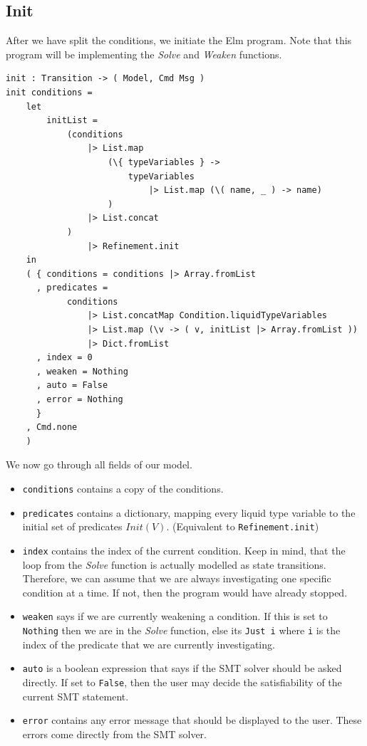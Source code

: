 \documentclass[]{scrbook}
\providecommand{\tightlist}{%
  \setlength{\itemsep}{0pt}\setlength{\parskip}{0pt}}
\theoremstyle{definition}
\theoremstyle{definition}
\theoremstyle{definition}
\theoremstyle{remark}
\begin{document}
\subsection{Init}\label{init}

After we have split the conditions, we initiate the Elm program. Note
that this program will be implementing the \emph{Solve} and
\emph{Weaken} functions.

\begin{verbatim}
init : Transition -> ( Model, Cmd Msg )
init conditions =
    let
        initList =
            (conditions
                |> List.map
                    (\{ typeVariables } ->
                        typeVariables
                            |> List.map (\( name, _ ) -> name)
                    )
                |> List.concat
            )
                |> Refinement.init
    in
    ( { conditions = conditions |> Array.fromList
      , predicates =
            conditions
                |> List.concatMap Condition.liquidTypeVariables
                |> List.map (\v -> ( v, initList |> Array.fromList ))
                |> Dict.fromList
      , index = 0
      , weaken = Nothing
      , auto = False
      , error = Nothing
      }
    , Cmd.none
    )
\end{verbatim}

We now go through all fields of our model.

\begin{itemize}
\tightlist
\item
  \texttt{conditions} contains a copy of the conditions.
\item
  \texttt{predicates} contains a dictionary, mapping every liquid type
  variable to the initial set of predicates \(\mathit{Init}(V)\).
  (Equivalent to \texttt{Refinement.init})
\item
  \texttt{index} contains the index of the current condition. Keep in
  mind, that the loop from the \emph{Solve} function is actually
  modelled as state transitions. Therefore, we can assume that we are
  always investigating one specific condition at a time. If not, then
  the program would have already stopped.
\item
  \texttt{weaken} says if we are currently weakening a condition. If
  this is set to \texttt{Nothing} then we are in the \emph{Solve}
  function, else its \texttt{Just\ i} where \texttt{i} is the index of
  the predicate that we are currently investigating.
\item
  \texttt{auto} is a boolean expression that says if the SMT solver
  should be asked directly. If set to \texttt{False}, then the user may
  decide the satisfiability of the current SMT statement.
\item
  \texttt{error} contains any error message that should be displayed to
  the user. These errors come directly from the SMT solver.
\end{itemize}
\end{document}
